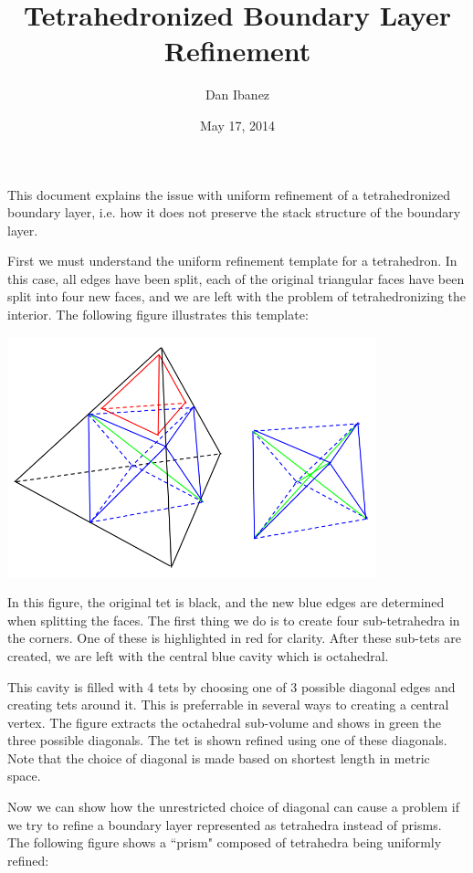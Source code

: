 \documentclass{article}
\title{Tetrahedronized Boundary Layer Refinement}
\author{Dan Ibanez}
\date{May 17, 2014}
\begin{document}
\maketitle

This document explains the issue with uniform refinement
of a tetrahedronized boundary layer, i.e. how it does not
preserve the stack structure of the boundary layer.

First we must understand the uniform refinement template
for a tetrahedron. In this case, all edges have been split,
each of the original triangular faces have been split into four
new faces, and we are left with the problem of tetrahedronizing
the interior. The following figure illustrates this template:

\includegraphics[width=0.8\textwidth]{tet_uniform_refine.png}

In this figure, the original tet is black, and the new blue edges are
determined when splitting the faces.
The first thing we do is to create four sub-tetrahedra in the corners.
One of these is highlighted in red for clarity.
After these sub-tets are created, we are left with the central blue cavity
which is octahedral.

This cavity is filled with 4 tets by choosing one of 3 possible diagonal
edges and creating tets around it.
This is preferrable in several ways to creating a central vertex.
The figure extracts the octahedral sub-volume and shows in green the three
possible diagonals.
The tet is shown refined using one of these diagonals.
Note that the choice of diagonal is made based on shortest length in metric
space.

Now we can show how the unrestricted choice of diagonal can cause a problem
if we try to refine a boundary layer represented as tetrahedra instead of
prisms.
The following figure shows a ``prism" composed of tetrahedra being uniformly
refined:
\end{document}
